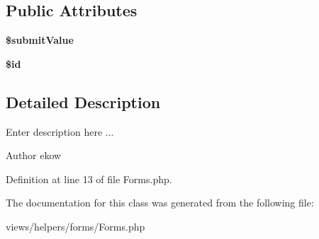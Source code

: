 \subsection*{Public Attributes}
\begin{DoxyCompactItemize}
\item 
\hypertarget{class_forms_aafd11fdf513da1fc32f1093d0c3de960}{
{\bfseries \$submitValue}}
\label{class_forms_aafd11fdf513da1fc32f1093d0c3de960}

\item 
\hypertarget{class_forms_a643397780e66b1e10e48a81d194a178c}{
{\bfseries \$id}}
\label{class_forms_a643397780e66b1e10e48a81d194a178c}

\end{DoxyCompactItemize}


\subsection{Detailed Description}
Enter description here ... \begin{DoxyAuthor}{Author}
ekow 
\end{DoxyAuthor}


Definition at line 13 of file Forms.php.



The documentation for this class was generated from the following file:\begin{DoxyCompactItemize}
\item 
views/helpers/forms/Forms.php\end{DoxyCompactItemize}

